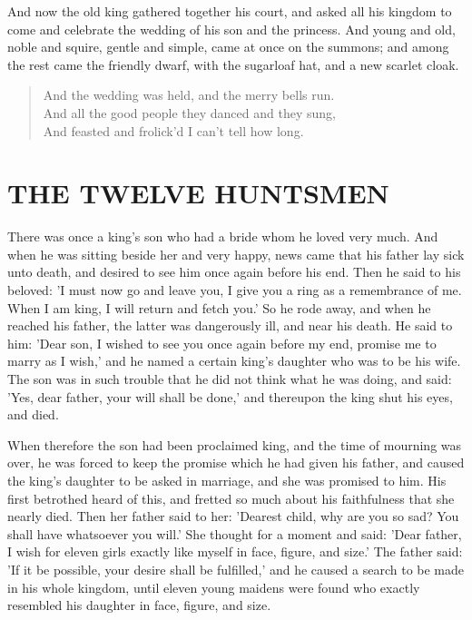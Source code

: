 \documentclass[12pt]{book}
\begin{document}
And now the old king gathered together his court, and asked all his
kingdom to come and celebrate the wedding of his son and the princess.
And young and old, noble and squire, gentle and simple, came at once
on the summons; and among the rest came the friendly dwarf, with the
sugarloaf hat, and a new scarlet cloak.

\begin{verse}
  And the wedding was held, and the merry bells run.\\
  And all the good people they danced and they sung,\\
  And feasted and frolick'd I can't tell how long.
\end{verse}


\chapter{THE TWELVE HUNTSMEN}

There was once a king's son who had a bride whom he loved very much.
And when he was sitting beside her and very happy, news came that his
father lay sick unto death, and desired to see him once again before
his end. Then he said to his beloved: 'I must now go and leave you, I
give you a ring as a remembrance of me. When I am king, I will return
and fetch you.' So he rode away, and when he reached his father, the
latter was dangerously ill, and near his death. He said to him: 'Dear
son, I wished to see you once again before my end, promise me to marry
as I wish,' and he named a certain king's daughter who was to be his
wife. The son was in such trouble that he did not think what he was
doing, and said: 'Yes, dear father, your will shall be done,' and
thereupon the king shut his eyes, and died.

When therefore the son had been proclaimed king, and the time of
mourning was over, he was forced to keep the promise which he had
given his father, and caused the king's daughter to be asked in
marriage, and she was promised to him. His first betrothed heard of
this, and fretted so much about his faithfulness that she nearly died.
Then her father said to her: 'Dearest child, why are you so sad? You
shall have whatsoever you will.' She thought for a moment and said:
'Dear father, I wish for eleven girls exactly like myself in face,
figure, and size.' The father said: 'If it be possible, your desire
shall be fulfilled,' and he caused a search to be made in his whole
kingdom, until eleven young maidens were found who exactly resembled
his daughter in face, figure, and size.
\end{document}
